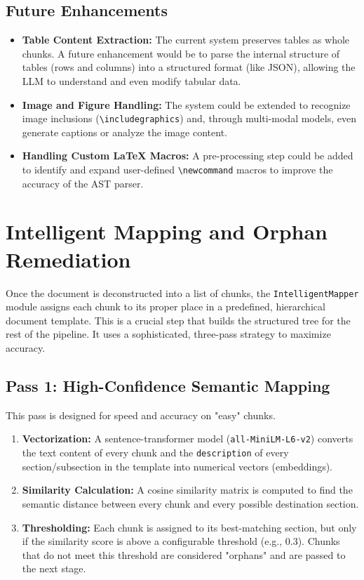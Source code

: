 \documentclass{article}
\begin{document}
\subsection{Future Enhancements}
\begin{itemize}
    \item \textbf{Table Content Extraction:} The current system preserves tables as whole chunks. A future enhancement would be to parse the internal structure of tables (rows and columns) into a structured format (like JSON), allowing the LLM to understand and even modify tabular data.
    \item \textbf{Image and Figure Handling:} The system could be extended to recognize image inclusions (\texttt{\textbackslash includegraphics}) and, through multi-modal models, even generate captions or analyze the image content.
    \item \textbf{Handling Custom LaTeX Macros:} A pre-processing step could be added to identify and expand user-defined \texttt{\textbackslash newcommand} macros to improve the accuracy of the AST parser.
\end{itemize}

\section{Intelligent Mapping and Orphan Remediation}
Once the document is deconstructed into a list of chunks, the \texttt{IntelligentMapper} module assigns each chunk to its proper place in a predefined, hierarchical document template. This is a crucial step that builds the structured tree for the rest of the pipeline. It uses a sophisticated, three-pass strategy to maximize accuracy.

\subsection{Pass 1: High-Confidence Semantic Mapping}
This pass is designed for speed and accuracy on "easy" chunks.
\begin{enumerate}
    \item \textbf{Vectorization:} A sentence-transformer model (\texttt{all-MiniLM-L6-v2}) converts the text content of every chunk and the \texttt{description} of every section/subsection in the template into numerical vectors (embeddings).
    \item \textbf{Similarity Calculation:} A cosine similarity matrix is computed to find the semantic distance between every chunk and every possible destination section.
    \item \textbf{Thresholding:} Each chunk is assigned to its best-matching section, but only if the similarity score is above a configurable threshold (e.g., 0.3). Chunks that do not meet this threshold are considered "orphans" and are passed to the next stage.
\end{enumerate}
\end{document}
